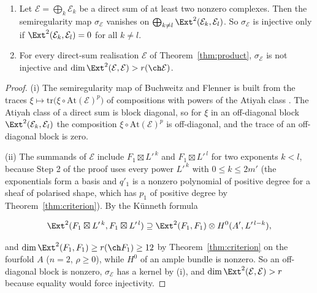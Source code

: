 \begin{proposition}\label{prop:directsum}
\leavevmode
\begin{enumerate}[label=\textup{(\roman*)},leftmargin=2.4em,itemsep=2pt]
\item Let $\mathcal{E}=\bigoplus_{k}\mathcal{E}_{k}$ be a direct sum of at least two nonzero complexes. Then the semiregularity map $\sigma_{\mathcal{E}}$ vanishes on $\bigoplus_{k\ne l}\Ext^{2}(\mathcal{E}_{k},\mathcal{E}_{l})$. So $\sigma_{\mathcal{E}}$ is injective only if $\Ext^{2}(\mathcal{E}_{k},\mathcal{E}_{l})=0$ for all $k\ne l$.
\item For every direct-sum realisation $\mathcal{E}$ of Theorem~\ref{thm:product}, $\sigma_{\mathcal{E}}$ is not injective and $\dim\Ext^{2}(\mathcal{E},\mathcal{E})>r(\ch\mathcal{E})$.
\end{enumerate}
\end{proposition}

\begin{proof}
(i) The semiregularity map of Buchweitz and Flenner is built from the traces $\xi\mapsto\mathrm{tr}\bigl(\xi\circ\mathrm{At}(\mathcal{E})^{p}\bigr)$ of compositions with powers of the Atiyah class \cite[Sect.~4]{BF03}. The Atiyah class of a direct sum is block diagonal, so for $\xi$ in an off-diagonal block $\Ext^{2}(\mathcal{E}_{k},\mathcal{E}_{l})$ the composition $\xi\circ\mathrm{At}(\mathcal{E})^{p}$ is off-diagonal, and the trace of an off-diagonal block is zero.

(ii) The summands of $\mathcal{E}$ include $F_{1}\boxtimes L'^{\,k}$ and $F_{1}\boxtimes L'^{\,l}$ for two exponents $k<l$, because Step 2 of the proof uses every power $L'^{\,k}$ with $0\le k\le2m'$ (the exponentials form a basis and $q'_{1}$ is a nonzero polynomial of positive degree for a sheaf of polarised shape, which has $p_{1}$ of positive degree by Theorem~\ref{thm:criterion}). By the K\"unneth formula
\begin{widetext}
\begin{equation}\label{eq:kunneth}
\Ext^{2}(F_{1}\boxtimes L'^{\,k},F_{1}\boxtimes L'^{\,l})\supseteq\Ext^{2}(F_{1},F_{1})\otimes H^{0}(A',L'^{\,l-k}),
\end{equation}
\end{widetext}
and $\dim\Ext^{2}(F_{1},F_{1})\ge r(\ch F_{1})\ge12$ by Theorem~\ref{thm:criterion} on the fourfold $A$ ($n=2$, $\rho\ge0$), while $H^{0}$ of an ample bundle is nonzero. So an off-diagonal block is nonzero, $\sigma_{\mathcal{E}}$ has a kernel by (i), and $\dim\Ext^{2}(\mathcal{E},\mathcal{E})>r$ because equality would force injectivity.
\end{proof}

